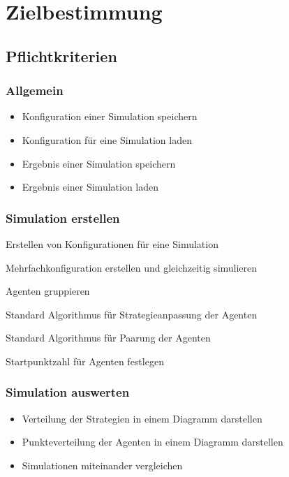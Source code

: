 \section{Zielbestimmung}

\subsection{Pflichtkriterien}

\subsubsection{Allgemein}
{\color{red}
\begin{itemize}
\item Konfiguration einer Simulation speichern
\item Konfiguration für eine Simulation laden
\item Ergebnis einer Simulation speichern
\item Ergebnis einer Simulation laden
\end{itemize}
}

\subsubsection{Simulation erstellen}

\begin{itemize}
\item Erstellen von Konfigurationen für eine Simulation
{\color{red}
\item Mehrfachkonfiguration erstellen und gleichzeitig simulieren
}
\item Agenten gruppieren
{\color{red}
\item Standard Algorithmus für Strategieanpassung der Agenten
\item Standard Algorithmus für Paarung der Agenten 
\item Startpunktzahl für Agenten festlegen
}
\end{itemize}


\subsubsection{Simulation auswerten}
\begin{itemize}
\item Verteilung der Strategien in einem Diagramm darstellen
\item Punkteverteilung der Agenten in einem Diagramm darstellen
\item Simulationen miteinander vergleichen
\end{itemize}

